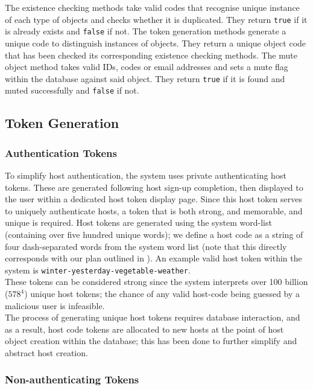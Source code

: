 \documentclass[9pt, titlepage]{extarticle}
\begin{document}
The existence checking methods take valid codes that recognise unique instance of each type of objects and checks whether it is duplicated. They return \texttt{true} if it is already exists and \texttt{false} if not. The token generation methods generate a unique code to distinguish instances of objects. They return a unique object code that has been checked its corresponding existence checking methods. The mute object method takes valid IDs, codes or email addresses and sets a mute flag within the database against said object. They return \texttt{true} if it is found and muted successfully and \texttt{false} if not.\\

\subsection{Token Generation}

\subsubsection{Authentication Tokens} \label{auth-tokens}

To simplify host authentication, the system uses private authenticating host tokens. These are generated following host sign-up completion, then displayed to the user within a dedicated host token display page. Since this host token serves to uniquely authenticate hosts, a token that is both strong, and memorable, and unique is required. Host tokens are generated using the system word-list (containing over five hundred unique words); we define a host code as a string of four dash-separated words from the system word list (note that this directly corresponds with our plan outlined in \cite{design-and-planning}). An example valid host token within the system is \texttt{winter-yesterday-vegetable-weather}. \\

These tokens can be considered strong since the system interprets over 100 billion ($578^4$) unique host tokens; the chance of any valid host-code being guessed by a malicious user is infeasible.\\

The process of generating unique host tokens requires database interaction, and as a result, host code tokens are allocated to new hosts at the point of host object creation within the database; this has been done to further simplify and abstract host creation. 

\subsubsection{Non-authenticating Tokens}
\end{document}
